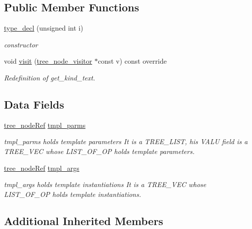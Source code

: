 \subsection*{Public Member Functions}
\begin{DoxyCompactItemize}
\item 
\hyperlink{structtype__decl_a62c12b7f964c26ec71338bde59581b8a}{type\+\_\+decl} (unsigned int i)
\begin{DoxyCompactList}\small\item\em constructor \end{DoxyCompactList}\item 
void \hyperlink{structtype__decl_a6c09e2072a083c2625e79de59006f7e6}{visit} (\hyperlink{classtree__node__visitor}{tree\+\_\+node\+\_\+visitor} $\ast$const v) const override
\begin{DoxyCompactList}\small\item\em Redefinition of get\+\_\+kind\+\_\+text. \end{DoxyCompactList}\end{DoxyCompactItemize}
\subsection*{Data Fields}
\begin{DoxyCompactItemize}
\item 
\hyperlink{tree__node_8hpp_a6ee377554d1c4871ad66a337eaa67fd5}{tree\+\_\+node\+Ref} \hyperlink{structtype__decl_a732d128d7bebd2003722530182d56183}{tmpl\+\_\+parms}
\begin{DoxyCompactList}\small\item\em tmpl\+\_\+parms holds template parameters It is a T\+R\+E\+E\+\_\+\+L\+I\+ST, his V\+A\+LU field is a T\+R\+E\+E\+\_\+\+V\+EC whose L\+I\+S\+T\+\_\+\+O\+F\+\_\+\+OP holds template parameters. \end{DoxyCompactList}\item 
\hyperlink{tree__node_8hpp_a6ee377554d1c4871ad66a337eaa67fd5}{tree\+\_\+node\+Ref} \hyperlink{structtype__decl_ac5424f901331baa665c47f545adf08e6}{tmpl\+\_\+args}
\begin{DoxyCompactList}\small\item\em tmpl\+\_\+args holds template instantiations It is a T\+R\+E\+E\+\_\+\+V\+EC whose L\+I\+S\+T\+\_\+\+O\+F\+\_\+\+OP holds template instantiations. \end{DoxyCompactList}\end{DoxyCompactItemize}
\subsection*{Additional Inherited Members}


